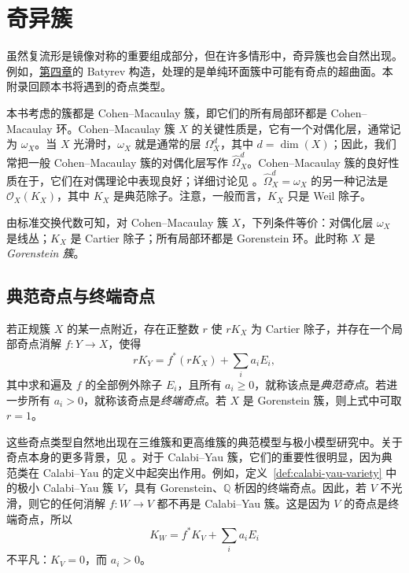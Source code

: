 \chapter{奇异簇}\label{app:singular-varieties}
虽然复流形是镜像对称的重要组成部分，但在许多情形中，奇异簇也会自然出现。例如，\hyperref[chap:mirror-constructions]{第四章}的 Batyrev 构造，处理的是单纯环面簇中可能有奇点的超曲面。本附录回顾本书将遇到的奇点类型。

本书考虑的簇都是 Cohen--Macaulay 簇，即它们的所有局部环都是 Cohen--Macaulay 环。Cohen--Macaulay 簇 $X$ 的关键性质是，它有一个对偶化层，通常记为 $\omega_X$。当 $X$ 光滑时，$\omega_X$ 就是通常的层 $\Omega_X^d$，其中 $d=\dim(X)$；因此，我们常把一般 Cohen--Macaulay 簇的对偶化层写作 $\widehat\Omega_X^d$。Cohen--Macaulay 簇的良好性质在于，它们在对偶理论中表现良好；详细讨论见 。$\widehat\Omega_X^d=\omega_X$ 的另一种记法是 $\mathcal O_X(K_X)$，其中 $K_X$ 是典范除子。注意，一般而言，$K_X$ 只是 Weil 除子。

由标准交换代数可知，对 Cohen--Macaulay 簇 $X$，下列条件等价：对偶化层 $\omega_X$ 是线丛；$K_X$ 是 Cartier 除子；所有局部环都是 Gorenstein 环。此时称 $X$ 是 \emph{Gorenstein 簇}。

\section{典范奇点与终端奇点}\label{sec:canonical-terminal-singularities}
若正规簇 $X$ 的某一点附近，存在正整数 $r$ 使 $rK_X$ 为 Cartier 除子，并存在一个局部奇点消解 $f:Y\to X$，使得
\begin{equation}\label{eq:canonical-terminal-discrepancies}
rK_Y=f^*(rK_X)+\sum_i a_iE_i,
\end{equation}
其中求和遍及 $f$ 的全部例外除子 $E_i$，且所有 $a_i\geq0$，就称该点是\emph{典范奇点}。若进一步所有 $a_i>0$，就称该奇点是\emph{终端奇点}。若 $X$ 是 Gorenstein 簇，则上式中可取 $r=1$。

这些奇点类型自然地出现在三维簇和更高维簇的典范模型与极小模型研究中。关于奇点本身的更多背景，见 。对于 Calabi--Yau 簇，它们的重要性很明显，因为典范类在 Calabi--Yau 的定义中起突出作用。例如，定义~\ref{def:calabi-yau-variety} 中的极小 Calabi--Yau 簇 $V$，具有 Gorenstein、$\mathbb Q$ 析因的终端奇点。因此，若 $V$ 不光滑，则它的任何消解 $f:W\to V$ 都不再是 Calabi--Yau 簇。这是因为 $V$ 的奇点是终端奇点，所以
\[
K_W=f^*K_V+\sum_i a_iE_i
\]
不平凡：$K_V=0$，而 $a_i>0$。

